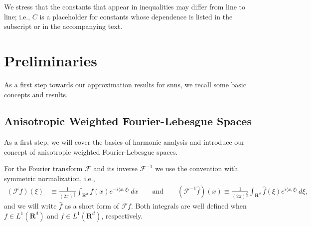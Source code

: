 \documentclass[a4paper]{article}
\newcommand{\rr}[1]{\mathbf{R}^{#1}}
\newcommand{\scal}[2]{\langle #1,#2\rangle}
\numberwithin{equation}{section}
\theoremstyle{remark}
\begin{document}
We stress that the constants that appear in inequalities may differ from
line to line; i.e., $C$ is a placeholder
for constants whose dependence is listed in the subscript or in the accompanying text.


\section{Preliminaries}\label{sec1}

As a first step towards our approximation results for \glspl{snn},
we recall some basic concepts and results.

\subsection{Anisotropic Weighted Fourier-Lebesgue Spaces}
As a first step, we will cover the basics of harmonic analysis
and introduce our concept of anisotropic weighted Fourier-Lebesgue spaces.

For the Fourier transform $\mathscr F$ and its inverse $\mathscr {F}^{-1}$ we use the convention with symmetric normalization,
i.e.,
\begin{align*}
(\mathscr Ff)(\xi )
&\equiv
\frac{1}{(2\pi)^{\frac{d}{2}}}\int _{\rr{d}} f(x)e^{-i\scal  x\xi }\, dx
\qquad\text{and}\qquad
(\mathscr {F}^{-1}\hat{f})(x )
\equiv
\frac{1}{(2\pi)^{\frac{d}{2}}}\int _{\rr{d}} \hat{f}(\xi)e^{i\scal  x\xi }\, d\xi,
\end{align*}
and we will write $\hat{f}$ as a short form of $\mathscr{F}f$.
Both integrals are well defined when $f\in L^1(\rr d)$ and $\hat{f}\in L^1(\rr d)$, respectively.
\end{document}
